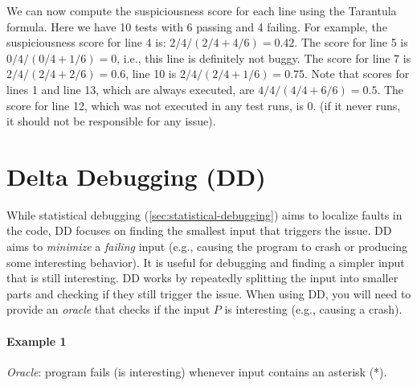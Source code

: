 \documentclass[oneside,11pt,dvipsnames]{book}
\begin{document}
We can now compute the suspiciousness score for each line using the Tarantula formula. Here we have 10 tests with 6 passing and 4 failing. 
For example, the suspiciousness score for line 4 is: $2/4 / (2/4 + 4/6) = 0.42$. The score for line 5 is $0/4 / (0/4 + 1/6) = 0$, i.e., this line is definitely not buggy. The score for line 7 is $2/4 / (2/4 + 2/6) = 0.6$, line 10 is $2/4 / (2/4 + 1/6) = 0.75$. 
Note that scores for lines 1 and line 13, which are always executed, are $4/4 / (4/4 + 6/6) = 0.5$. The score for line 12, which was not executed in any test runs, is 0. (if it never runs, it should not be responsible for any issue).




\section{Delta Debugging (DD)}
While statistical debugging (\autoref{sec:statistical-debugging}) aims to localize faults in the code,  DD focuses on finding the smallest input that triggers the issue. DD aims to \emph{minimize} a \emph{failing} input  (e.g., causing the program to crash or producing some interesting behavior). It is useful for debugging and finding a simpler input that is still interesting. DD works by repeatedly splitting the input into smaller parts and checking if they still trigger the issue. When using DD, you will need to provide an \emph{oracle} that checks if the input $P$ is interesting (e.g., causing a crash). 

\paragraph{Example 1} \emph{Oracle}: program fails (is interesting) whenever input contains an asterisk (*). 
\end{document}

